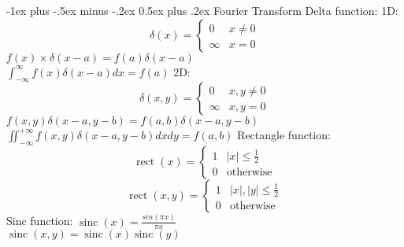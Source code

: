 \documentclass[dvipdfmx,a4paper,10pt,landscape]{article}
\makeatletter
\renewcommand{\section}{\@startsection{section}{1}{0mm}%
                                {-1ex plus -.5ex minus -.2ex}%
                                {0.5ex plus .2ex}%
                                {\normalfont\large\bfseries}}
\DeclareMathOperator{\sinc}{sinc}
\DeclareMathOperator{\rect}{rect}
\makeatother
\begin{document}
\begin{multicols}{3}
    \section{Fourier Transform}
    Delta function:
    1D:
    \begin{equation*}
        \delta(x)=
        \begin{cases}
            0      & x \neq 0 \\
            \infty & x = 0
        \end{cases}
    \end{equation*}
    $f(x)\times\delta(x-a)=f(a)\delta(x-a)$ \\
    $\int_{-\infty}^{\infty}f(x)\delta(x-a)dx=f(a)$
    2D:
    \begin{equation*}
        \delta(x,y)=
        \begin{cases}
            0      & x,y \neq 0 \\
            \infty & x,y = 0
        \end{cases}
    \end{equation*}
    $    f(x,y)\delta(x-a,y-b)=f(a,b)\delta(x-a,y-b)$ \\
    $\iint_{-\infty}^{+\infty}f(x,y)\delta(x-a,y-b)dxdy=f(a,b)
    $
    Rectangle function:
    \begin{equation*}
        \rect(x)   =
        \begin{cases}
            1 & |x|\leq\frac{1}{2} \\
            0 & \text{otherwise}
        \end{cases}
    \end{equation*}
    \begin{equation*}
        \rect(x,y) =
        \begin{cases}
            1 & |x|,|y|\leq\frac{1}{2} \\
            0 & \text{otherwise}
        \end{cases}
    \end{equation*}
    Sinc function:
    $
        \sinc(x)    =\frac{sin(\pi x)}{\pi x}     $                          \\
    $\sinc(x,y)  = \sinc(x)\sinc(y)
    $


\end{multicols}
\end{document}

